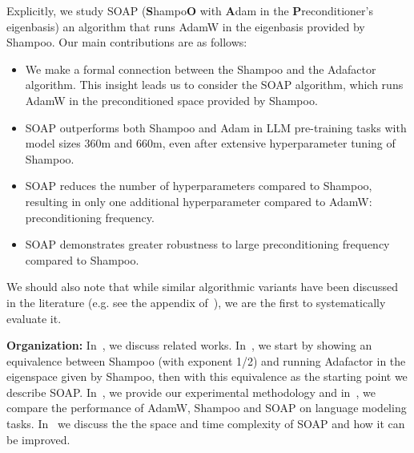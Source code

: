 \documentclass{article} %
\begin{document}
Explicitly, we study SOAP (\textbf{S}hampo\textbf{O} with \textbf{A}dam in the \textbf{P}reconditioner's eigenbasis) an algorithm that runs AdamW in the eigenbasis provided by Shampoo.  Our main contributions are as follows:

\begin{itemize} 
	\item We make a formal connection between the Shampoo and the Adafactor algorithm. This insight leads us to consider the SOAP algorithm, which runs AdamW in the preconditioned space provided by Shampoo. 
	\item SOAP outperforms both Shampoo and Adam in LLM pre-training tasks with model sizes 360m and 660m, even after extensive hyperparameter tuning of Shampoo. 
	\item SOAP reduces the number of hyperparameters compared to Shampoo, resulting in only one additional hyperparameter compared to AdamW: preconditioning frequency. 
	\item SOAP demonstrates greater robustness to large preconditioning frequency compared to Shampoo. 
\end{itemize}

We should also note that while similar algorithmic variants have been discussed in the literature (e.g. see the appendix of~\citet{anil2020scalable}), we are the first to systematically evaluate it.



\textbf{Organization:} In~, we discuss related works. In~, we start by showing an equivalence between Shampoo (with exponent 1/2) and running Adafactor in the eigenspace given by Shampoo, then with this equivalence as the starting point we describe SOAP. In~, we provide our experimental methodology and in~, we compare the performance of AdamW, Shampoo and SOAP on language modeling tasks. In~ we discuss the the space and time complexity of SOAP and how it can be improved. 
\end{document}

